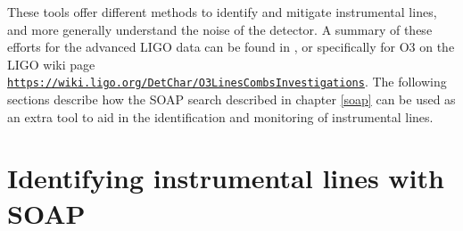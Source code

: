 \begin{description}
	
\end{description}


These tools offer different methods to identify and mitigate instrumental lines, and more generally understand the noise of the detector. A summary of these efforts for
the advanced \gls{LIGO} data can be found in
\citep{covas2018IdentificationMitigation}, or specifically for O3 on the \gls{LIGO} wiki page {\tt
\url{https://wiki.ligo.org/DetChar/O3LinesCombsInvestigations}}. The following
sections describe how the SOAP search described in chapter \ref{soap} can be used
as an extra tool to aid in the identification and monitoring of instrumental
lines.

\clearpage

\section{\label{detchar:soap}Identifying instrumental lines with SOAP}

